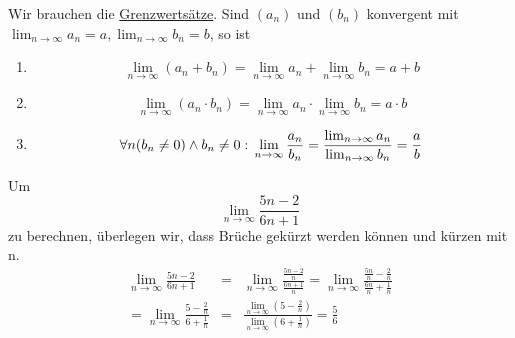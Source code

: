 \documentclass{report}
\begin{document}
\newpage
Wir brauchen die \underline{Grenzwertsätze}. Sind $(a_n)$ und $(b_n)$ konvergent mit $\lim_{n \to \infty}a_n = a, \lim_{n \to \infty}b_n = b$, so ist
\begin{enumerate}
\item \begin{equation}\lim_{n \to \infty}(a_n + b_n) = \lim_{n \to \infty}a_n + \lim_{n \to \infty}b_n = a + b\end{equation}
\item \begin{equation}\lim_{n \to \infty}(a_n \cdot b_n) = \lim_{n \to \infty}a_n \cdot \lim_{n \to \infty}b_n = a \cdot b\end{equation}
\item \begin{equation}\forall n (b_n \neq 0) \land b_n \neq 0 :\\
\lim_{n \to \infty}\frac{a_n}{b_n} = \frac{\lim_{n \to \infty}a_n}{\lim_{n \to \infty}b_n} = \frac{a}{b}\end{equation}
\end{enumerate}
Um
\begin{equation}\lim_{n \to \infty}\frac{5n-2}{6n+1}\end{equation}
zu berechnen, überlegen wir, dass Brüche gekürzt werden können und kürzen mit n.
\begin{eqnarray}\lim_{n \to \infty}\frac{5n-2}{6n+1} & = & \lim_{n \to \infty}\frac{\frac{5n-2}{n}}{\frac{6n+1}{n}} = \lim_{n \to \infty}\frac{\frac{5n}{n}-\frac{2}{n}}{\frac{6n}{n}+\frac{1}{n}} \nonumber \\
= \lim_{n \to \infty}\frac{5-\frac{2}{n}}{6+\frac{1}{n}} & =  &\frac{\lim_{n \to \infty}(5-\frac{2}{n})}{\lim_{n \to \infty}(6+\frac{1}{n})} = \frac{5}{6}\end{eqnarray}
\end{document}
